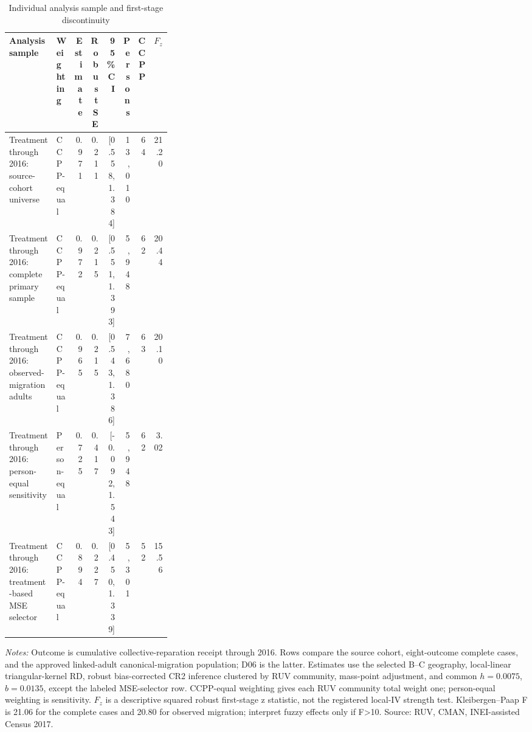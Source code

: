 \begin{table}[!htbp]
\centering
\scriptsize
\caption{Individual analysis sample and first-stage discontinuity}
\label{tab:rd_outcomes_first_stage_2017_individual}
\begin{tabular}{p{0.31\linewidth}lrrrrrr}
\toprule
Analysis sample & Weighting & Estimate & Robust SE & 95\% CI & Persons & CCPP & \(F_z\) \\
\midrule
Treatment through 2016: source-cohort universe & CCPP-equal & 0.971 & 0.211 & [0.558, 1.384] & 13,010 & 64 & 21.20 \\
Treatment through 2016: complete primary sample & CCPP-equal & 0.972 & 0.215 & [0.551, 1.393] & 5,948 & 62 & 20.44 \\
Treatment through 2016: observed-migration adults & CCPP-equal & 0.965 & 0.215 & [0.543, 1.386] & 7,680 & 63 & 20.10 \\
Treatment through 2016: person-equal sensitivity & Person-equal & 0.725 & 0.417 & [-0.092, 1.543] & 5,948 & 62 & 3.02 \\
Treatment through 2016: treatment-based MSE selector & CCPP-equal & 0.894 & 0.227 & [0.450, 1.339] & 5,301 & 52 & 15.56 \\
\bottomrule
\end{tabular}
\parbox{0.97\linewidth}{\footnotesize \textit{Notes:} Outcome is cumulative collective-reparation receipt through 2016. Rows compare the source cohort, eight-outcome complete cases, and the approved linked-adult canonical-migration population; D06 is the latter. Estimates use the selected B--C geography, local-linear triangular-kernel RD, robust bias-corrected CR2 inference clustered by RUV community, mass-point adjustment, and common \(h=0.0075\), \(b=0.0135\), except the labeled MSE-selector row. CCPP-equal weighting gives each RUV community total weight one; person-equal weighting is sensitivity. \(F_z\) is a descriptive squared robust first-stage z statistic, not the registered local-IV strength test. Kleibergen--Paap F is 21.06 for the complete cases and 20.80 for observed migration; interpret fuzzy effects only if F>10. Source: RUV, CMAN, INEI-assisted Census 2017.}
\end{table}
